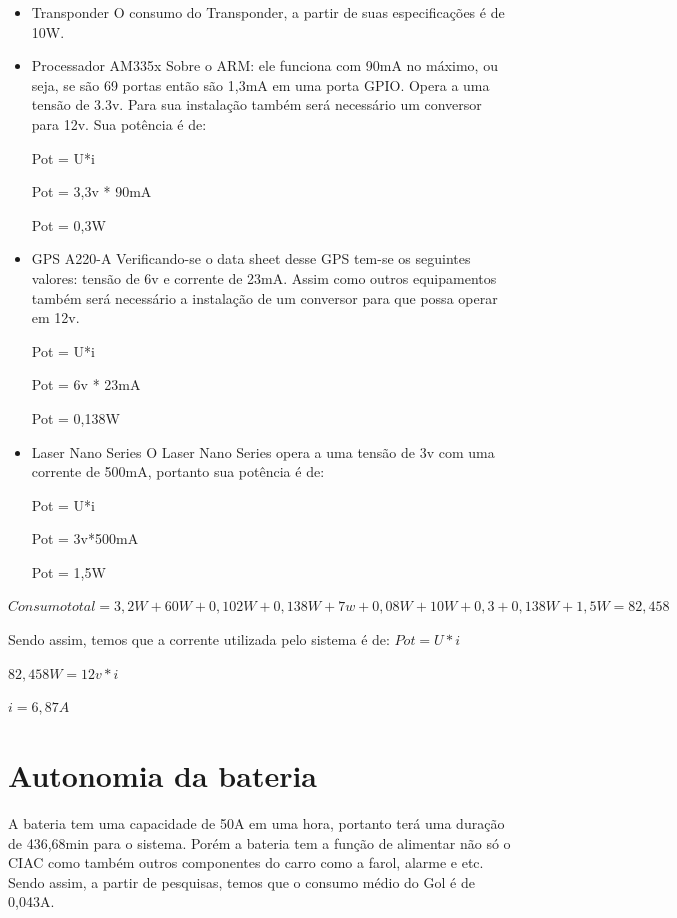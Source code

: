 \begin{itemize}
\item{Transponder}
O consumo do Transponder, a partir de suas especificações é de 10W.

\item{Processador AM335x}
Sobre o ARM: ele funciona com 90mA no máximo, ou seja, se são 69 portas então são 1,3mA em uma porta GPIO. Opera a uma tensão de 3.3v. Para sua instalação também será necessário um conversor para 12v. Sua potência é de:

Pot = U*i

Pot = 3,3v * 90mA

Pot = 0,3W

\item{GPS A220-A}
Verificando-se o data sheet desse GPS tem-se os seguintes valores: tensão de 6v e corrente de 23mA. Assim como outros equipamentos também será necessário a instalação de um conversor para que possa operar em 12v.

Pot = U*i

Pot = 6v * 23mA

Pot = 0,138W

\item{Laser Nano Series}
O Laser Nano Series opera a uma tensão de 3v com uma corrente de 500mA, portanto sua potência é de:

Pot = U*i

Pot = 3v*500mA

Pot = 1,5W

\end{itemize}

$ Consumo total = 3,2W + 60W + 0,102W + 0,138W + 7w + 0,08W + 10W +0,3 +0,138W + 1,5W = 82,458 $

Sendo assim, temos que a corrente utilizada pelo sistema é de:
	$ Pot = U * i $

	$ 82,458W = 12v * i $

	$ i = 6,87A $

\section{Autonomia da bateria}
 
A bateria tem uma capacidade de 50A em uma hora, portanto terá uma duração de 436,68min para o sistema. Porém a bateria tem a função de alimentar não só o CIAC como também outros componentes do carro como a farol, alarme e etc. Sendo assim, a partir de pesquisas, temos que o consumo médio do Gol é de 0,043A.

